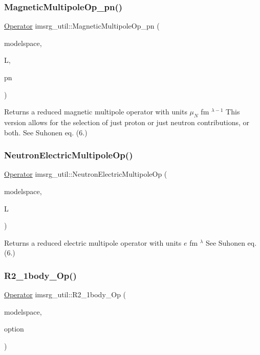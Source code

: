\subsubsection{\texorpdfstring{Magnetic\+Multipole\+Op\+\_\+pn()}{MagneticMultipoleOp\_pn()}}
{\footnotesize\ttfamily \hyperlink{classOperator}{Operator} imsrg\+\_\+util\+::\+Magnetic\+Multipole\+Op\+\_\+pn (\begin{DoxyParamCaption}\item[{\hyperlink{classModelSpace}{Model\+Space} \&}]{modelspace,  }\item[{int}]{L,  }\item[{string}]{pn }\end{DoxyParamCaption})}

Returns a reduced magnetic multipole operator with units $ \mu_{N}$ fm $ ^{\lambda-1} $ This version allows for the selection of just proton or just neutron contributions, or both. See Suhonen eq. (6.) \mbox{\label{namespaceimsrg__util_a0845fbd56e8ec3b3e6ff84c2d41297ca}} 
\subsubsection{\texorpdfstring{Neutron\+Electric\+Multipole\+Op()}{NeutronElectricMultipoleOp()}}
{\footnotesize\ttfamily \hyperlink{classOperator}{Operator} imsrg\+\_\+util\+::\+Neutron\+Electric\+Multipole\+Op (\begin{DoxyParamCaption}\item[{\hyperlink{classModelSpace}{Model\+Space} \&}]{modelspace,  }\item[{int}]{L }\end{DoxyParamCaption})}

Returns a reduced electric multipole operator with units $ e$ fm $^{\lambda} $ See Suhonen eq. (6.) \mbox{\label{namespaceimsrg__util_a300ae3fc79d6513d4d3f0ff8b624caf2}} 
\subsubsection{\texorpdfstring{R2\+\_\+1body\+\_\+\+Op()}{R2\_1body\_Op()}}
{\footnotesize\ttfamily \hyperlink{classOperator}{Operator} imsrg\+\_\+util\+::\+R2\+\_\+1body\+\_\+\+Op (\begin{DoxyParamCaption}\item[{\hyperlink{classModelSpace}{Model\+Space} \&}]{modelspace,  }\item[{string}]{option }\end{DoxyParamCaption})}

